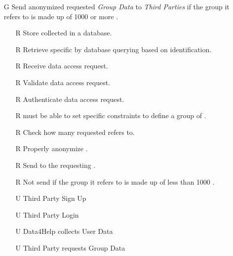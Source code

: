 \documentclass[../../../rasd.tex]{subfiles}
\begin{document}
\begin{itemize}
    \item[G\subs{3}]Send anonymized requested \textit{Group Data} to \textit{Third Parties} if the group it refers to is made up of 1000 or more .
    \begin{itemize}
        \item[R\subs{11}]Store collected  in a database.
        \item[R\subs{12}]Retrieve specific  by database querying based on  identification.
        \item[R\subs{13}]Receive  data access request.
        \item[R\subs{14}]Validate  data access request.
        \item[R\subs{15}]Authenticate  data access request.
        \item[R\subs{21}] must be able to set specific constraints to define a group of .
        \item[R\subs{22}]Check how many  requested  refers to.
        \item[R\subs{23}]Properly anonymize .
        \item[R\subs{24}]Send  to the requesting .
        \item[R\subs{25}]Not send  if the group it refers to is made up of less than 1000 .
        \\
        \item[U\subs{2}]Third Party Sign Up
        \item[U\subs{4}]Third Party Login
        \item[U\subs{5}]Data4Help collects User Data
        \item[U\subs{7}]Third Party requests Group Data
    \end{itemize}


\end{itemize}
\end{document}
